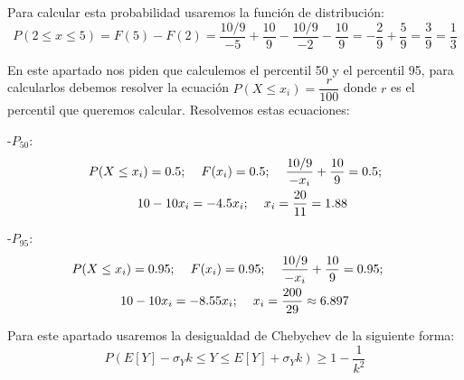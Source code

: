 \subproblem

Para calcular esta probabilidad usaremos la función de distribución:
\begin{equation*}
    P(2 \leq x \leq 5) = F(5) - F(2) = \dfrac{10/9}{-5} + \dfrac{10}{9} - \dfrac{10/9}{-2} -\dfrac{10}{9} = - \dfrac{2}{9} + \dfrac{5}{9} = \dfrac{3}{9} = \dfrac{1}{3}
\end{equation*}

\subproblem

En este apartado nos piden que calculemos el percentil 50 y el percentil 95, para calcularlos debemos resolver la ecuación $P(X \leq x_i) = \dfrac{r}{100}$ donde $r$ es el percentil que queremos calcular. Resolvemos estas ecuaciones:

-$P_{50}$:
\begin{gather*}
    P(X \leq x_i) = 0.5 ; \hspace{0.4cm} F(x_i) = 0.5 ; \hspace{0.4cm} \dfrac{10/9}{-x_i} + \dfrac{10}{9} = 0.5 ;  \\\hspace{0.4cm} 10-10x_i = -4.5x_i ; \hspace{0.4cm} x_i = \dfrac{20}{11} = 1.88
\end{gather*}

-$P_{95}$:
\begin{gather*}
    P(X \leq x_i) = 0.95 ; \hspace{0.4cm} F(x_i) = 0.95 ; \hspace{0.4cm}\dfrac{10/9}{-x_i} + \dfrac{10}{9} = 0.95 ; \hspace{0.4cm} \\ 10-10x_i = -8.55x_i ; \hspace{0.4cm}x_i = \dfrac{200}{29} \approx 6.897
\end{gather*}

\subproblem

Para este apartado usaremos la desigualdad de Chebychev de la siguiente forma:
\begin{equation*}
    P(E[Y] - \sigma_Y k \leq Y \leq E[Y] + \sigma_Y k) \geq 1-\dfrac{1}{k^2}
\end{equation*}

